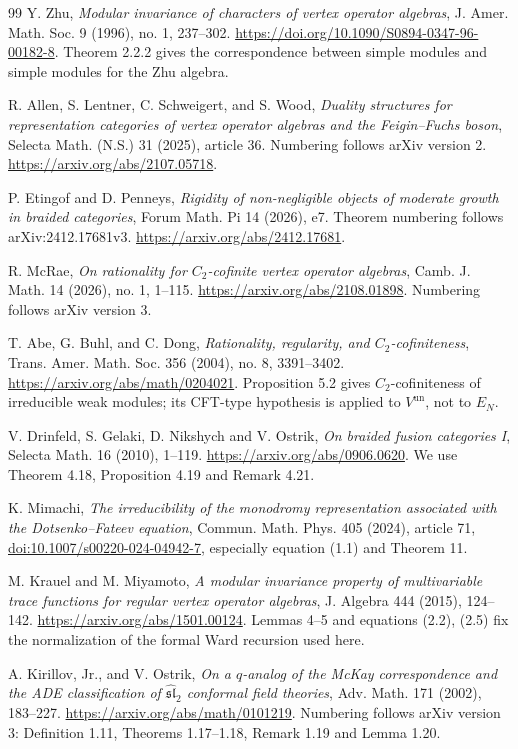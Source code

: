 \documentclass[11pt,a4paper]{article}
\numberwithin{equation}{section}
\theoremstyle{definition}\newtheorem{definition}[theorem]{Definition}
\theoremstyle{remark}\newtheorem{remark}[theorem]{Remark}
\begin{document}
\begin{thebibliography}{99}
Y. Zhu,
\emph{Modular invariance of characters of vertex operator algebras},
J. Amer. Math. Soc. 9 (1996), no. 1, 237--302.
\url{https://doi.org/10.1090/S0894-0347-96-00182-8}.
Theorem 2.2.2 gives the correspondence between simple modules
and simple modules for the Zhu algebra.


R. Allen, S. Lentner, C. Schweigert, and S. Wood,
\emph{Duality structures for representation categories of vertex
operator algebras and the Feigin--Fuchs boson},
Selecta Math. (N.S.) 31 (2025), article 36.
Numbering follows arXiv version 2.
\url{https://arxiv.org/abs/2107.05718}.


P. Etingof and D. Penneys,
\emph{Rigidity of non-negligible objects of moderate growth in
braided categories}, Forum Math. Pi 14 (2026), e7.
Theorem numbering follows arXiv:2412.17681v3.
\url{https://arxiv.org/abs/2412.17681}.


R. McRae,
\emph{On rationality for $C_2$-cofinite vertex operator algebras},
Camb. J. Math. 14 (2026), no. 1, 1--115.
\url{https://arxiv.org/abs/2108.01898}.
Numbering follows arXiv version 3.


T. Abe, G. Buhl, and C. Dong,
\emph{Rationality, regularity, and \(C_2\)-cofiniteness},
Trans. Amer. Math. Soc. 356 (2004), no. 8, 3391--3402.
\url{https://arxiv.org/abs/math/0204021}.
Proposition 5.2 gives $C_2$-cofiniteness of irreducible weak modules;
its CFT-type hypothesis is applied to $V^{\mathrm{un}}$, not to $E_N$.


V. Drinfeld, S. Gelaki, D. Nikshych and V. Ostrik,
\emph{On braided fusion categories I},
Selecta Math. 16 (2010), 1--119.
\url{https://arxiv.org/abs/0906.0620}.
We use Theorem 4.18, Proposition 4.19 and Remark 4.21.


K. Mimachi, \emph{The irreducibility of the monodromy representation
associated with the Dotsenko--Fateev equation},
Commun. Math. Phys. 405 (2024), article 71,
\href{https://doi.org/10.1007/s00220-024-04942-7}{doi:10.1007/s00220-024-04942-7},
especially equation (1.1) and Theorem 11.


M. Krauel and M. Miyamoto,
\emph{A modular invariance property of multivariable trace functions
for regular vertex operator algebras}, J. Algebra 444 (2015), 124--142.
\url{https://arxiv.org/abs/1501.00124}.
Lemmas 4--5 and equations (2.2), (2.5) fix the normalization of the
formal Ward recursion used here.


A. Kirillov, Jr., and V. Ostrik,
\emph{On a $q$-analog of the McKay correspondence and the ADE
classification of $\widehat{\mathfrak{sl}}_2$ conformal field theories},
Adv. Math. 171 (2002), 183--227.
\url{https://arxiv.org/abs/math/0101219}.
Numbering follows arXiv version 3: Definition 1.11,
Theorems 1.17--1.18, Remark 1.19 and Lemma 1.20.



\end{thebibliography}
\end{document}
